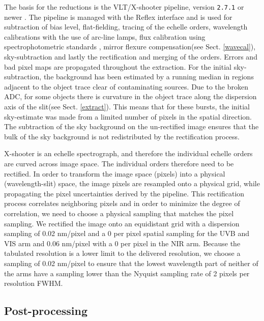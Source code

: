 \documentclass{aa}    %
\begin{document}
The basis for the reductions is the VLT/X-shooter pipeline, version
\texttt{2.7.1} or newer \citep{Goldoni2006, Modigliani2010}. The pipeline is
managed with the Reflex interface \citep{Freudling2013} and is used for
subtraction of bias level, flat-fielding, tracing of the echelle orders,
wavelength calibrations with the use of arc-line lamps, flux calibration using
spectrophotometric standards \citep{Vernet2010, Hamuy1994}, mirror flexure
compensation(see Sect. \ref{wavecal}), sky-subtraction and lastly the
rectification and merging of the orders. Errors and bad pixel maps are
propagated throughout the extraction. For the initial sky-subtraction, the
background has been estimated by a running median in regions adjacent to the
object trace clear of contaminating sources. Due to the broken ADC, for some
objects there is curvature in the object trace along the dispersion axis of the
slit(see Sect. \ref{extract}). This means that for these bursts, the initial
sky-estimate was made from a limited number of pixels in the spatial direction.
The subtraction of the sky background on the un-rectified image ensures that the
bulk of the sky background is not redistributed by the rectification process.

X-shooter is an echelle spectrograph, and therefore the individual echelle
orders are curved across image space. The individual orders therefore need to be
rectified. In order to transform the image space (pixels) into a physical
(wavelength-slit) space, the image pixels are resampled onto a physical grid,
while propagating the pixel uncertainties derived by the pipeline. This
rectification  process correlates neighboring pixels and in order to minimize
the degree of correlation, we need to choose a physical sampling that matches
the pixel sampling. We rectified the image onto an equidistant grid with a
dispersion sampling of 0.02 nm/pixel and a 0 per pixel spatial sampling
for the UVB and VIS arm and 0.06 nm/pixel with a 0 per pixel in the NIR
arm.  Because the tabulated resolution is a lower limit to the delivered
resolution, we choose a sampling of 0.02 nm/pixel to ensure that the lowest
wavelength part of neither of the arms have a sampling lower than the Nyquist
sampling rate of 2 pixels per resolution FWHM.

\subsection{Post-processing} \label{postproc}
\end{document}
